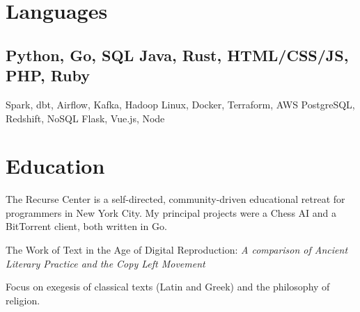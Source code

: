 \documentclass[]{deedy-resume-openfont}
\begin{document}
\section{Languages}
\vspace{\topsep} %
\subsection{Python, Go, SQL \textbullet{} Java, Rust, HTML/CSS/JS, PHP, Ruby}
\vspace{\topsep} %
Spark, dbt, Airflow, Kafka, Hadoop \textbullet{} Linux, Docker, Terraform, AWS \textbullet{} PostgreSQL, Redshift, NoSQL \textbullet{} Flask, Vue.js, Node
\sectionsep


\section{Education}
\vspace{\topsep} %
\vspace{\topsep} %
The Recurse Center is a self-directed, community-driven educational retreat for programmers in New York City.\newline
My principal projects were a Chess AI and a BitTorrent client, both written in Go.
\sectionsep


\vspace{\topsep} %
The Work of Text in the Age of Digital Reproduction:
\textit{A comparison of Ancient Literary Practice and the Copy Left Movement}
\sectionsep %

\vspace{\topsep} %
Focus on exegesis of classical texts (Latin and Greek) and the philosophy of religion.
\sectionsep
\end{document}
